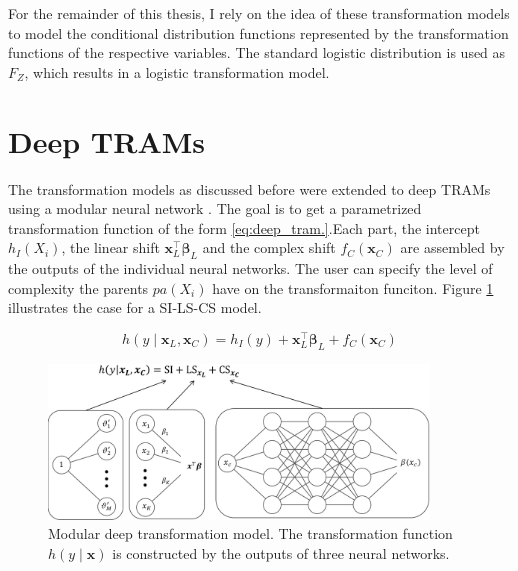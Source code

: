 For the remainder of this thesis, I rely on the idea of these transformation models to model the conditional distribution functions represented by the transformation functions of the respective variables. The standard logistic distribution is used as $F_Z$, which results in a logistic transformation model.


\section{Deep TRAMs} \label{sec:deep_trams}

The transformation models as discussed before were extended to deep TRAMs using a modular neural network \citep{sick2020}. The goal is to get a parametrized transformation function of the form \ref{eq:deep_tram.}.Each part, the intercept $h_I(X_i)$, the linear shift $\mathbf{x}_L^\top \boldsymbol{\beta}_L$ and the complex shift $f_C(\mathbf{x}_C)$ are assembled by the outputs of the individual neural networks. The user can specify the level of complexity the parents $pa(X_i)$ have on the transformaiton funciton. Figure \ref{fig:deep_tram} illustrates the case for a SI-LS-CS model.

\begin{equation}
h(y \mid \mathbf{x}_L, \mathbf{x}_C ) = h_I(y) + \mathbf{x}_L^\top \boldsymbol{\beta}_L + f_C(\mathbf{x}_C)
\label{eq:deep_tram}
\end{equation}



\begin{figure}[H]
\centering
\includegraphics[width=0.9\textwidth]{img/deep_tram.png}
\caption{Modular deep transformation model. The transformation function $h(y \mid \mathbf{x})$ is constructed by the outputs of three neural networks.}
\label{fig:deep_tram}
\end{figure}

